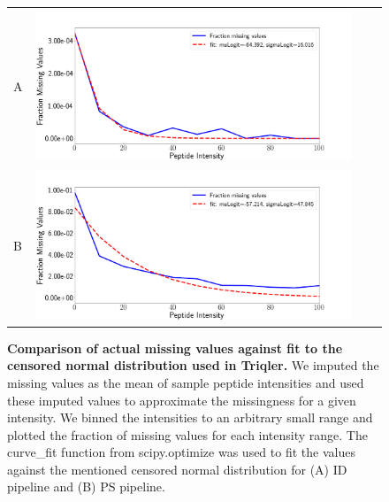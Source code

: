 \documentclass[11pt]{article}
\begin{document}
\begin{figure}[hbt]
    \centering
    \centering
    \begin{tabular}{lclc} 
        A & \includegraphics[width=0.80\linewidth]{../../result/report_plots_pipeline/fraction_missing_values_ID.png} \\ %
        B & \includegraphics[width=0.80\linewidth]{../../result/report_plots_pipeline/fraction_missing_values_PS.png} \\%
    \end{tabular}
    \caption{{\bf Comparison of actual missing values against fit to the censored normal distribution used in Triqler.} We imputed the missing values as the mean of sample peptide intensities and used these imputed values to approximate the missingness for a given intensity. We binned the intensities to an arbitrary small range and plotted the fraction of missing values for each intensity range. The curve\_fit function from scipy.optimize was used to fit the values against the mentioned censored normal distribution for (A) ID pipeline  and (B) PS pipeline. \label{fig:fraction_missing_values}}
\end{figure}
\end{document}
